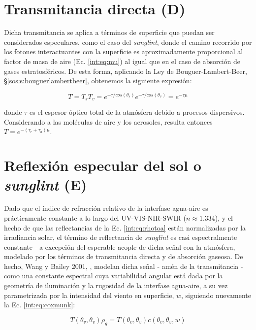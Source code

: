\section{Transmitancia directa (D)}
\label{int:s:tDir}

    Dicha transmitancia se aplica a términos de superficie que puedan ser considerados especulares, como el caso del \textit{sunglint}, donde el camino recorrido por los fotones interactuantes con la superficie es aproximadamente proporcional al factor de masa de aire (Ec. \ref{int:eq:mu}) al igual que en el caso de absorción de gases estratosféricos. De esta forma, aplicando la Ley de Bouguer-Lambert-Beer, \S \ref{sos:s:bouguerlambertbeer}, obtenemos la siguiente expresión:
    
    \begin{equation}
        T = T_{s}T_{v} = e^{-\tau/cos(\theta_{s})}e^{-\tau/cos(\theta_{v})} = e^{-\tau \mu}
        \label{int:eq:tDir}
    \end{equation}
    
    \noindent donde $\tau$ es el espesor óptico total de la atmósfera debido a procesos dispersivos. Considerando a las moléculas de aire y los aerosoles, resulta entonces $T = e^{-(\tau_{r} + \tau_{a})\mu}$.
    
\section{Reflexión especular del sol o \textit{sunglint} (E)}
\label{int:s:sunglint}
    
    Dado que el índice de refracción relativo de la interfase agua-aire es prácticamente constante a lo largo del UV-VIS-NIR-SWIR ($n\approx 1.334$), y el hecho de que las reflectancias de la Ec. \ref{int:eq:rhotoa} están normalizadas por la irradiancia solar, el término de reflectancia de \textit{sunglint} es casi espectralmente constante - a excepción del esperable acople de dicha señal con la atmósfera, modelado por los términos de transmitancia directa y de absorción gaseosa. De hecho, Wang y Bailey 2001, \cite{wang2001}, modelan dicha señal - amén de la transmitancia - como una constante espectral cuya variabilidad angular está dada por la geometría de iluminación y la rugosidad de la interfase agua-aire, a su vez parametrizada por la intensidad del viento en superficie, $w$, siguiendo nuevamente la Ec. \ref{int:eq:coxmunk}:
    
    \begin{equation}
        T(\theta_{v},\theta_{v})\rho_{g} = T(\theta_{v},\theta_{v})c(\theta_{v},\theta_{v},w)
        \label{int:eq:rhoglint}
    \end{equation}
    
